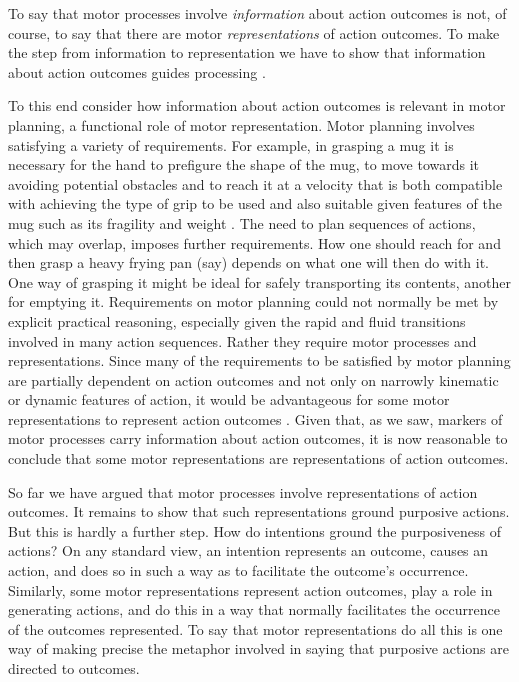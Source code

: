 \documentclass[12pt,\papersize]{extarticle}
\begin{document}
To say that motor processes involve \emph{information} about action outcomes is not, of course, to say that there are motor \emph{representations} of action outcomes.  To make the step from information to representation we have to show that information about action outcomes guides processing \citep[compare][]{Dretske:1988sq}. 

To this end  consider how information about action outcomes is relevant in motor planning, a functional role of motor representation.  Motor planning involves satisfying a variety of requirements. For example, in grasping a mug it is necessary for the hand to prefigure the shape of the mug, to move towards it avoiding potential obstacles and to reach it at a velocity that is both compatible with achieving the type of grip to be used and also suitable given features of the mug such as its fragility and weight \citep{Jeannerod:1995bb,jeannerod:1998nbo}. The need to plan sequences of actions, which may overlap, imposes further requirements. How one should reach for and then grasp a heavy frying pan (say) depends on what one will then do with it. One way of grasping it might be ideal for safely transporting its contents, another for emptying it. 
Requirements on motor planning could not normally be met by explicit practical reasoning, especially given the rapid and fluid transitions involved in many action sequences. 
Rather they require motor processes and representations.
Since 
many of the requirements to be satisfied by motor planning
are partially dependent on action outcomes and not only on  narrowly kinematic or dynamic features of action,
it would be advantageous for some  motor representations to represent action outcomes . 
Given that, as we saw, markers of motor processes carry information about action outcomes, it is now reasonable to conclude that some motor representations are representations of action outcomes.

So far we have argued that motor processes involve representations of action outcomes. It remains to show that such representations ground purposive actions. But this is hardly a further step. How do intentions ground the purposiveness of actions?  On any standard view, an intention represents an outcome, causes an action, and does so in such a way as to facilitate the outcome's occurrence. Similarly, some motor representations  represent action outcomes, play a role in generating actions, and do this in a way that normally facilitates the occurrence of the outcomes represented. To say that motor representations do all this is one way of making precise the metaphor involved in saying that purposive actions are directed to outcomes.  
\end{document}
